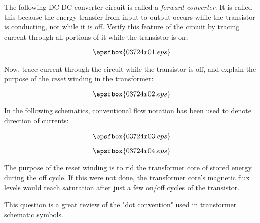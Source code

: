 

The following DC-DC converter circuit is called a {\it forward converter}.  It is called this because the energy transfer from input to output occurs while the transistor is conducting, not while it is off.  Verify this feature of the circuit by tracing current through all portions of it while the transistor is on:

$$\epsfbox{03724x01.eps}$$

Now, trace current through the circuit while the transistor is off, and explain the purpose of the {\it reset} winding in the transformer:

$$\epsfbox{03724x02.eps}$$







In the following schematics, conventional flow notation has been used to denote direction of currents:

$$\epsfbox{03724x03.eps}$$

$$\epsfbox{03724x04.eps}$$

The purpose of the reset winding is to rid the transformer core of stored energy during the off cycle.  If this were not done, the transformer core's magnetic flux levels would reach saturation after just a few on/off cycles of the transistor.







This question is a great review of the "dot convention" used in transformer schematic symbols.




